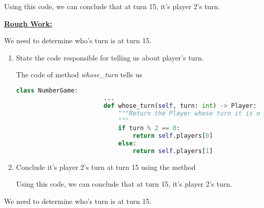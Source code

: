 \documentclass[12pt]{article}
\begin{document}
\begin{enumerate}[1.]
\begin{itemize}
        \bigskip

        Using this code, we can conclude that at turn 15, it's player 2's turn.

        \bigskip

        \begin{mdframed}
            \underline{\textbf{Rough Work:}}

            \bigskip

            We need to determine who's turn is at turn 15.

            \bigskip

            \begin{enumerate}[1.]
                \item State the code responsible for telling us about player's turn.

                \bigskip

                \begin{mdframed}

                    The code of method \textit{whose\_turn} tells us

                    \begin{lstlisting}[language=Python]
                    class NumberGame:
                        ...
                        def whose_turn(self, turn: int) -> Player:
                            """Return the Player whose turn it is on the given turn number.
                            """
                            if turn % 2 == 0:
                                return self.players[0]
                            else:
                                return self.players[1]
                    \end{lstlisting}

                \end{mdframed}

                \bigskip

                \item Conclude it's player 2's turn at turn 15 using the method

                \bigskip

                \begin{mdframed}

                Using this code, we can conclude that at turn 15, it's player 2's turn.
                \end{mdframed}
            \end{enumerate}

            \begin{mdframed}
                We need to determine who's turn is at turn 15.


\end{mdframed}
\end{mdframed}
\end{itemize}
\end{enumerate}
\end{document}
